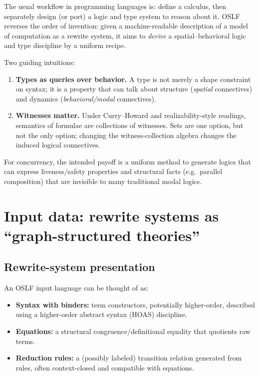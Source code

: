 \documentclass[11pt]{article}
\newcommand{\OSLF}{\textsf{OSLF}}
\begin{document}
The usual workflow in programming languages is: define a calculus, then separately design (or port)
a logic and type system to reason about it. \OSLF{} reverses the order of invention: given a
machine-readable description of a model of computation as a rewrite system, it aims to
\emph{derive} a spatial--behavioral logic and type discipline by a uniform recipe.

Two guiding intuitions:

\begin{enumerate}[label=(\arabic*)]
\item \textbf{Types as queries over behavior.}
A type is not merely a shape constraint on syntax; it is a property that can talk about
structure (\emph{spatial} connectives) and dynamics (\emph{behavioral/modal} connectives).

\item \textbf{Witnesses matter.}
Under Curry--Howard and realizability-style readings, semantics of formulae are collections of
witnesses. Sets are one option, but not the only option; changing the witness-collection algebra
changes the induced logical connectives.
\end{enumerate}

For concurrency, the intended payoff is a uniform method to generate logics that can express
liveness/safety properties and structural facts (e.g.\ parallel composition) that are invisible to
many traditional modal logics.

\section{Input data: rewrite systems as ``graph-structured theories''}

\subsection{Rewrite-system presentation}
An \OSLF{} input language can be thought of as:

\begin{itemize}
\item \textbf{Syntax with binders:} term constructors, potentially higher-order, described using
a higher-order abstract syntax (HOAS) discipline.
\item \textbf{Equations:} a structural congruence/definitional equality that quotients raw terms.
\item \textbf{Reduction rules:} a (possibly labeled) transition relation generated from rules, often
context-closed and compatible with equations.
\end{itemize}
\end{document}
